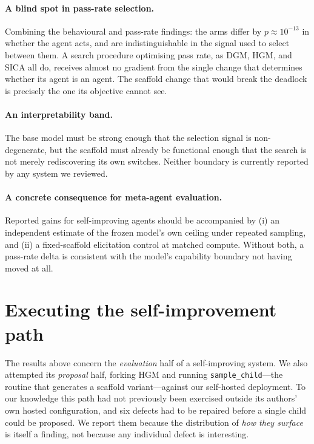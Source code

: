 \documentclass{article}
\begin{document}
\paragraph{A blind spot in pass-rate selection.}
Combining the behavioural and pass-rate findings: the arms differ by
$p\approx10^{-13}$ in whether the agent acts, and are indistinguishable in the
signal used to select between them. A search procedure optimising pass
rate, as DGM, HGM, and SICA all do, receives almost no gradient from the
single change that determines whether its agent is an agent. The scaffold
change that would break the deadlock is precisely the one its objective cannot
see.

\paragraph{An interpretability band.}
The base model must be strong enough that the selection signal is
non-degenerate, but the scaffold must already be functional enough that the
search is not merely rediscovering its own switches. Neither boundary is
currently reported by any system we reviewed.

\paragraph{A concrete consequence for meta-agent evaluation.}
Reported gains for self-improving agents should be accompanied by (i) an
independent estimate of the frozen model's own ceiling under repeated sampling,
and (ii) a fixed-scaffold elicitation control at matched compute. Without both,
a pass-rate delta is consistent with the model's capability boundary not having
moved at all.

\section{Executing the self-improvement path}
\label{sec:repro}

The results above concern the \emph{evaluation} half of a self-improving
system. We also attempted its \emph{proposal} half, forking HGM and running
\texttt{sample\_child}---the routine that generates a scaffold variant---against
our self-hosted deployment. To our knowledge this path had not previously been
exercised outside its authors' own hosted configuration, and six defects had to
be repaired before a single child could be proposed. We report them because the
distribution of \emph{how they surface} is itself a finding, not because any
individual defect is interesting.
\end{document}
